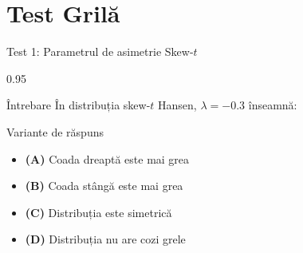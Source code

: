 \documentclass[9pt, aspectratio=169, t]{beamer}
\begin{document}
\section{Test Grilă}

\begin{frame}{Test 1: Parametrul de asimetrie Skew-$t$}
    \begin{cminipage}{0.95\textwidth}
    \begin{alertblock}{Întrebare}
        În distribuția skew-$t$ Hansen, $\lambda = -0.3$ înseamnă:
    \end{alertblock}
    \begin{block}{Variante de răspuns}
    \begin{itemize}\setlength{\itemsep}{0pt}
        \item \textcolor{MainBlue}{\textbf{(A)}} Coada dreaptă este mai grea
        \item \textcolor{MainBlue}{\textbf{(B)}} Coada stângă este mai grea
        \item \textcolor{MainBlue}{\textbf{(C)}} Distribuția este simetrică
        \item \textcolor{MainBlue}{\textbf{(D)}} Distribuția nu are cozi grele
    \end{itemize}
    \end{block}
    \end{cminipage}
\end{frame}
\end{document}
